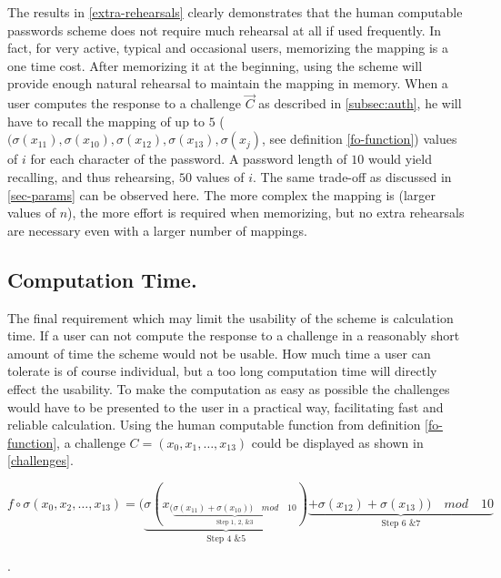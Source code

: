 \par The results in \autoref{extra-rehearsals} clearly demonstrates that the human computable passwords scheme does not require much rehearsal at all if used frequently. In fact, for very active, typical and occasional users, memorizing the mapping is a one time cost. After memorizing it at the beginning, using the scheme will provide enough natural rehearsal to maintain the mapping in memory. 
When a user computes the response to a challenge $\vec C$ as described in \autoref{subsec:auth}, he will have to recall the mapping of up to $5$ ($(\sigma(x_{11}), \sigma(x_{10}), \sigma(x_{12}), \sigma(x_{13}),\sigma(x_j)$, see definition \ref{fo-function}) values of $i$ for each character of the password. A password length of $10$ would yield recalling, and thus rehearsing, $50$ values of $i$. The same trade-off as discussed in \autoref{sec-params} can be observed here. The more complex the mapping is (larger values of $n$), the more effort is required when memorizing, but no extra rehearsals are necessary even with a larger number of mappings.

    \subsection{Computation Time.}\label{computation-time}
The final requirement which may limit the usability of the scheme is calculation time. If a user can not compute the response to a challenge in a reasonably short amount of time the scheme would not be usable. How much time a user can tolerate is of course individual, but a too long computation time will directly effect the usability. To make the computation as easy as possible the challenges would have to be presented to the user in a practical way, facilitating fast and reliable calculation. Using the human computable function from definition \ref{fo-function}, a challenge $C = (x_0, x_1,\dots, x_{13})$ could be displayed as shown in \autoref{challenges}. \\ 
\centerline{ $f\circ \sigma(x_0,x_2,\dots,x_{13}) = \big(\underbrace{\sigma ( x_{ (\underbrace{\sigma(x_{11}) + \sigma(x_{10}) )\quad mod \quad 10}_\text{Step 1, 2, \& 3}} )}_\text{Step 4 \& 5} \underbrace{ +\sigma ( x_{12} ) + \sigma( x_{13} )\big)\quad mod \quad 10 }_\text{Step 6 \& 7}$ }. 

